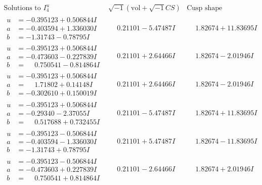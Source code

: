\documentclass[1p]{elsarticle_modified}
\theoremstyle{definition}
\newcommand{\I}{\sqrt{-1}}
\begin{document}
$$\begin{array}{c|c|c}  
\text{Solutions to }I^u_{4}& \I (\text{vol} + \sqrt{-1}CS) & \text{Cusp shape}\\
 \hline 
\begin{aligned}
u &= -0.395123 + 0.506844 I \\
a &= -0.403594 + 1.336030 I \\
b &= -1.31743 - 0.78795 I\end{aligned}
 & \phantom{-}0.21101 - 5.47487 I & \phantom{-}1.82674 + 11.83695 I \\ \hline\begin{aligned}
u &= -0.395123 + 0.506844 I \\
a &= -0.473603 - 0.227839 I \\
b &= \phantom{-}0.750541 - 0.814864 I\end{aligned}
 & \phantom{-}0.21101 + 2.64466 I & \phantom{-}1.82674 - 2.01946 I \\ \hline\begin{aligned}
u &= -0.395123 + 0.506844 I \\
a &= \phantom{-}1.71802 + 0.14148 I \\
b &= -0.302610 + 0.150019 I\end{aligned}
 & \phantom{-}0.21101 + 2.64466 I & \phantom{-}1.82674 - 2.01946 I \\ \hline\begin{aligned}
u &= -0.395123 + 0.506844 I \\
a &= -0.29340 - 2.37055 I \\
b &= \phantom{-}0.517688 + 0.732455 I\end{aligned}
 & \phantom{-}0.21101 - 5.47487 I & \phantom{-}1.82674 + 11.83695 I \\ \hline\begin{aligned}
u &= -0.395123 - 0.506844 I \\
a &= -0.403594 - 1.336030 I \\
b &= -1.31743 + 0.78795 I\end{aligned}
 & \phantom{-}0.21101 + 5.47487 I & \phantom{-}1.82674 - 11.83695 I \\ \hline\begin{aligned}
u &= -0.395123 - 0.506844 I \\
a &= -0.473603 + 0.227839 I \\
b &= \phantom{-}0.750541 + 0.814864 I\end{aligned}
 & \phantom{-}0.21101 - 2.64466 I & \phantom{-}1.82674 + 2.01946 I \\ \hline\begin{aligned}

\end{aligned}
\end{array}$$
\end{document}

